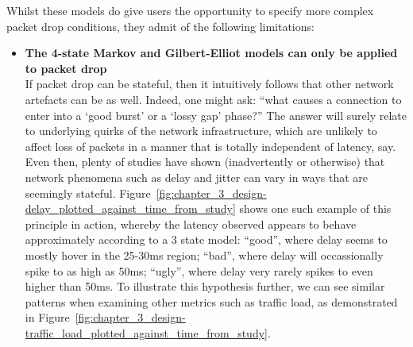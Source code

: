 \newpage

Whilst these models do give users the opportunity to specify more complex packet drop conditions, they admit of the
following limitations:
\begin{itemize}
    \item \textbf{The 4-state Markov and Gilbert-Elliot models can only be applied to packet drop} \\
    If packet drop can be stateful, then it intuitively follows that other network artefacts can be as well. Indeed,
    one might ask: ``what causes a connection to enter into a `good burst' or a `lossy gap' phase?'' The answer will
    surely relate to underlying quirks of the network infrastructure, which are unlikely to affect loss of packets in
    a manner that is totally independent of latency, say. Even then, plenty of studies have shown (inadvertently or
    otherwise) that network phenomena such as delay and jitter can vary in ways that are seemingly
    stateful\cite{hpbn_mobile_networks, a_close_examination_of_4G_lte_networks,
        gsma_4G_5G_experience_evaluation_guideline, mobile_broadband_networks_under_mobility,
        emulating_3G_4G_networks, study_on_quality_of_service_in_4G_and_5G_networks,
        speed_test_russian_4G_LTE_internet_provider_Beeline}.
    Figure~\ref{fig:chapter_3_design-delay_plotted_against_time_from_study} shows one such example of this principle
    in action, whereby the latency observed appears to behave approximately according to a 3 state model: ``good'',
    where delay seems to mostly hover in the 25-30ms region; ``bad'', where delay will occassionally spike to as high
    as 50ms; ``ugly'', where delay very rarely spikes to even higher than 50ms. To illustrate this hypothesis
    further, we can see similar patterns when examining other metrics such as traffic load, as demonstrated in
    Figure~\ref{fig:chapter_3_design-traffic_load_plotted_against_time_from_study}. \\ \\


\end{itemize}
